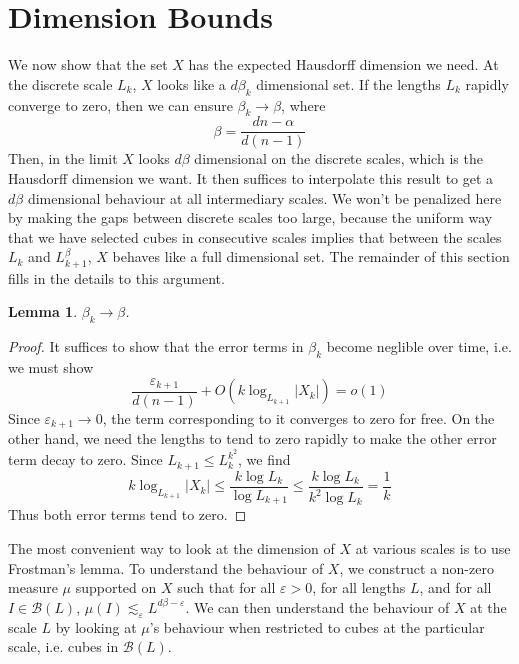 \documentclass{article}
\theoremstyle{plain}
\newtheorem{lemma}{Lemma}
\theoremstyle{plain}
\begin{document}
\section{Dimension Bounds}

We now show that the set $X$ has the expected Hausdorff dimension we need. At the discrete scale $L_k$, $X$ looks like a $d \beta_k$ dimensional set. If the lengths $L_k$ rapidly converge to zero, then we can ensure $\beta_k \to \beta$, where
%
\[ \beta = \frac{dn - \alpha}{d(n - 1)} \]
%
Then, in the limit $X$ looks $d \beta$ dimensional on the discrete scales, which is the Hausdorff dimension we want. It then suffices to interpolate this result to get a $d\beta$ dimensional behaviour at all intermediary scales. We won't be penalized here by making the gaps between discrete scales too large, because the uniform way that we have selected cubes in consecutive scales implies that between the scales $L_k$ and $L_{k+1}^\beta$, $X$ behaves like a full dimensional set. The remainder of this section fills in the details to this argument.

\begin{lemma}
	$\beta_k \to \beta$.
\end{lemma}
\begin{proof}
	It suffices to show that the error terms in $\beta_k$ become neglible over time, i.e. we must show
	\[ \frac{\varepsilon_{k+1}}{d(n-1)} + O(k \log_{L_{k+1}} |X_k|) = o(1) \]
	Since $\varepsilon_{k+1} \to 0$, the term corresponding to it converges to zero for free. On the other hand, we need the lengths to tend to zero rapidly to make the other error term decay to zero. Since $L_{k+1} \leq L_k^{k^2}$, we find
	\[ k \log_{L_{k+1}} |X_k| \leq \frac{k \log L_k}{\log L_{k+1}} \leq \frac{k \log L_k}{k^2 \log L_k} = \frac{1}{k} \]
	Thus both error terms tend to zero.
\end{proof}

The most convenient way to look at the dimension of $X$ at various scales is to use Frostman's lemma. To understand the behaviour of $X$, we construct a non-zero measure $\mu$ supported on $X$ such that for all $\varepsilon > 0$, for all lengths $L$, and for all $I \in \mathcal{B}(L)$, $\mu(I) \lesssim_\varepsilon L^{d\beta - \varepsilon}$. We can then understand the behaviour of $X$ at the scale $L$ by looking at $\mu$'s behaviour when restricted to cubes at the particular scale, i.e. cubes in $\mathcal{B}(L)$.
\end{document}
